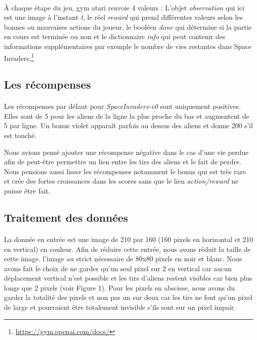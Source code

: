 \documentclass[12pt,oneside,a4paper]{article}
\begin{document}
    \paragraph{}
    À chaque étape du jeu, gym atari renvoie 4 valeurs :
    L'objet \textit{observation} qui ici est une image à l'instant \textit{t}, le réel \textit{reward} qui
    prend différentes valeurs selon les bonnes ou mauvaises actions du joueur,
    le booléen \textit{done} qui détermine si la partie en cours est terminée ou non et
    le dictionnaire \textit{info} qui peut contenir des informations supplémentaires
    par exemple le nombre de vies restantes dans Space Invaders.\footnote{\url{https://gym.openai.com/docs/}}

    \subsection{Les récompenses}

    \paragraph{}
    Les récompenses par défaut pour \textit{SpaceInvaders-v0} sont uniquement positives.
    Elles sont de 5 pour les aliens de la ligne la plus proche du bas et augmentent de 5 par ligne.
    Un bonus violet apparaît parfois au dessus des aliens et donne 200 s'il est touché.

    Nous avions pensé ajouter une récompense négative dans le cas d'une vie perdue afin de peut-être
    permettre un lien entre les tirs des aliens et le fait de perdre. Nous pensions aussi lisser les
    récompenses notamment le bonus qui est très rare et crée des fortes croissances dans les scores sans que
    le lien \textit{action/reward} ne puisse être fait.

    \newpage

    \subsection{Traitement des données}

    \paragraph{}
    La donnée en entrée est une image de 210 par 160 (160 pixels en horizontal et 210 en vertical)
    en couleur. Afin de réduire cette entrée, nous avons réduit la taille de cette image.
    l'image au strict nécessaire de 80x80 pixels en noir et blanc. Nous avons fait le choix
    de ne garder qu'un seul pixel sur 2 en vertical car aucun déplacement vertical n'est possible et
    les tirs d'aliens restent visibles car bien plus longs que 2 pixels (voir Figure 1). Pour les pixels en abscisse,
    nous avons du garder la totalité des pixels et non pas un sur deux car les tirs
    ne font qu'un pixel de large et pourraient être totalement invisible s'ils sont sur un pixel impair.
\end{document}
